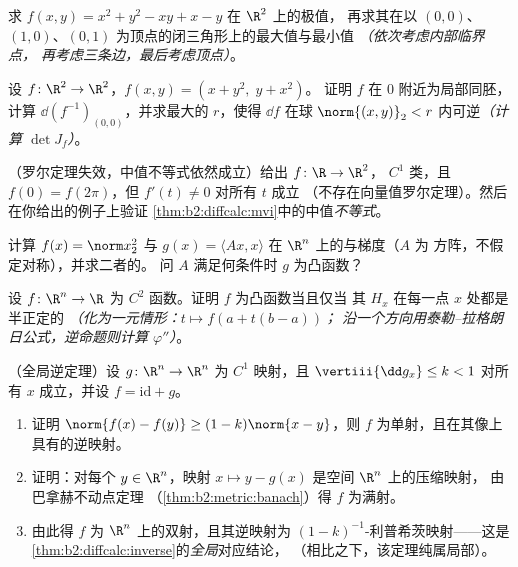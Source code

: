 \begin{exercise}[$\star\star$]\label{exo:b2:diffcalc:7}
求 $f(x, y) = x^2 + y^2 - xy + x - y$ 在 $\R^2$ 上的极值，
再求其在以 $(0,0)$、$(1,0)$、$(0,1)$ 为顶点的闭三角形上的最大值与最小值
\emph{（依次考虑内部临界点，
再考虑三条边，最后考虑顶点）}。
\end{exercise}

\begin{exercise}[$\star\star\star$]\label{exo:b2:diffcalc:8}
设 $f \colon \R^2 \to \R^2$，$f(x, y) = (x + y^2,\; y + x^2)$。
证明 $f$ 在 $0$ 附近为局部同胚，计算
$\dd(f^{-1})_{(0,0)}$，并求最大的 $r$，使得 $\dd f$
在球 $\norm{(x,y)}_2 < r$ 内可逆\emph{（计算
$\det J_f$）}。
\end{exercise}

\begin{exercise}[$\star\star\star$]\label{exo:b2:diffcalc:9}
（罗尔定理失效，中值不等式依然成立）给出 $f \colon \R \to \R^2$，
$C^1$ 类，且 $f(0) = f(2\pi)$，但 $f'(t) \neq 0$ 对所有 $t$ 成立
（不存在向量值罗尔定理）。然后在你给出的例子上验证
\cref{thm:b2:diffcalc:mvi}中的中值\emph{不等式}。
\end{exercise}

\begin{exercise}[$\star$]\label{exo:b2:diffcalc:10}
计算 $f(x) = \norm
x_2^2$ 与 $g(x) = \langle Ax, x\rangle$ 在 $\R^n$ 上的与梯度（$A$ 为
方阵，不假定对称），并求二者的。
问 $A$ 满足何条件时 $g$ 为凸函数？
\end{exercise}

\begin{exercise}[$\star\star$]\label{exo:b2:diffcalc:11}
设 $f \colon \R^n \to \R$ 为 $C^2$ 函数。证明 $f$ 为凸函数当且仅当
其 $H_x$ 在每一点 $x$ 处都是半正定的
\emph{（化为一元情形：$t \mapsto f(a + t(b-a))$；
沿一个方向用泰勒–拉格朗日公式，逆命题则计算
$\varphi''$）}。
\end{exercise}

\begin{exercise}[$\star\star\star$]\label{exo:b2:diffcalc:12}
（全局逆定理）设 $g \colon \R^n \to \R^n$ 为 $C^1$ 映射，且
$\vertiii{\dd g_x} \leq k < 1$ 对所有 $x$ 成立，并设 $f =
\mathrm{id} + g$。
\begin{enumerate}
  \item 证明 $\norm{f(x) - f(y)} \geq (1 - k)\norm{x - y}$，则 $f$
        为单射，且在其像上具有的逆映射。
  \item 证明：对每个 $y \in \R^n$，映射 $x \mapsto y -
        g(x)$ 是空间 $\R^n$ 上的压缩映射，
        由巴拿赫不动点定理
        （\cref{thm:b2:metric:banach}）得 $f$ 为满射。
  \item 由此得 $f$ 为 $\R^n$ 上的双射，且其逆映射为
        $(1-k)^{-1}$-利普希茨映射——这是
        \cref{thm:b2:diffcalc:inverse}的\emph{全局}对应结论，
        （相比之下，该定理纯属局部）。
\end{enumerate}
\end{exercise}

